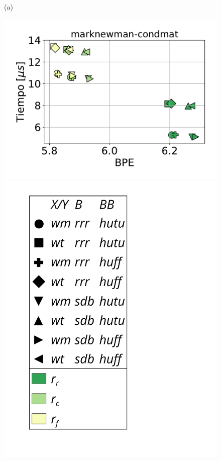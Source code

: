 \begin{figure}
\begin{minipage}{1\textwidth}
\begin{minipage}{0.45\textwidth}
    			(a)
    		\end{minipage}
    		\begin{minipage}{0.45\textwidth}
    			\centering
    			\begin{minipage}{0.75\textwidth}
    				\centering
    				\includegraphics[width=1\linewidth]{img/sdsl/aleatorio/marknewman-condmat.pdf}
    			\end{minipage}
    			\begin{minipage}{0.2\textwidth}
    				\centering
    				\includegraphics[scale=.16, clip, trim=70 0 0 0]{img/sdsl/label.pdf}

\end{minipage}
\end{minipage}
\end{minipage}
\end{figure}
